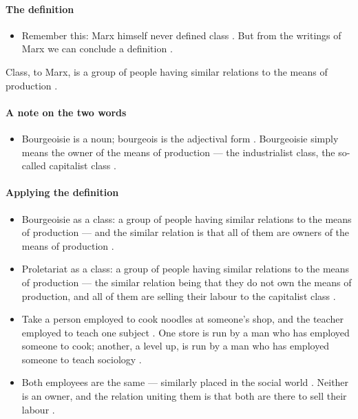 \paragraph{The definition}
\begin{itemize}
    \item Remember this: Marx himself never defined class . But from the writings of Marx we can conclude a definition .
\end{itemize}

\begin{KeyConcept}
Class, to Marx, is a group of people having similar relations to the means of production .
\end{KeyConcept}

\paragraph{A note on the two words}
\begin{itemize}
    \item Bourgeoisie is a noun; bourgeois is the adjectival form . Bourgeoisie simply means the owner of the means of production --- the industrialist class, the so-called capitalist class .
\end{itemize}

\paragraph{Applying the definition}
\begin{itemize}
    \item Bourgeoisie as a class: a group of people having similar relations to the means of production --- and the similar relation is that all of them are owners of the means of production .
    \item Proletariat as a class: a group of people having similar relations to the means of production --- the similar relation being that they do not own the means of production, and all of them are selling their labour to the capitalist class .
\end{itemize}

\begin{ExampleBox}
\begin{itemize}
    \item Take a person employed to cook noodles at someone's shop, and the teacher employed to teach one subject . One store is run by a man who has employed someone to cook; another, a level up, is run by a man who has employed someone to teach sociology .
    \item Both employees are the same --- similarly placed in the social world . Neither is an owner, and the relation uniting them is that both are there to sell their labour .
\end{itemize}
\end{ExampleBox}

